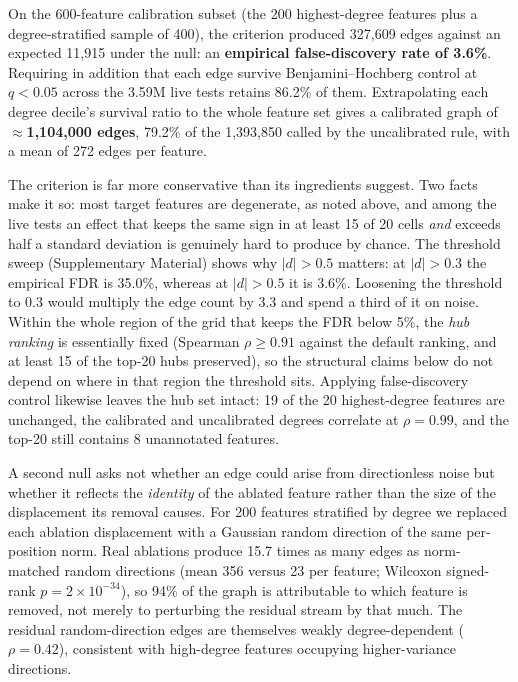 \documentclass[11pt,onecolumn]{article}
\begin{document}
On the 600-feature calibration subset (the 200 highest-degree features plus a degree-stratified sample of 400), the criterion produced 327{,}609 edges against an expected 11{,}915 under the null: an \textbf{empirical false-discovery rate of 3.6\%}. Requiring in addition that each edge survive Benjamini--Hochberg control at $q<0.05$ across the 3.59M live tests retains 86.2\% of them. Extrapolating each degree decile's survival ratio to the whole feature set gives a calibrated graph of \textbf{$\approx$1{,}104{,}000 edges}, 79.2\% of the 1{,}393{,}850 called by the uncalibrated rule, with a mean of 272 edges per feature.

The criterion is far more conservative than its ingredients suggest. Two facts make it so: most target features are degenerate, as noted above, and among the live tests an effect that keeps the same sign in at least 15 of 20 cells \emph{and} exceeds half a standard deviation is genuinely hard to produce by chance. The threshold sweep (Supplementary Material) shows why $|d|>0.5$ matters: at $|d|>0.3$ the empirical FDR is 35.0\%, whereas at $|d|>0.5$ it is 3.6\%. Loosening the threshold to $0.3$ would multiply the edge count by 3.3 and spend a third of it on noise. Within the whole region of the grid that keeps the FDR below 5\%, the \emph{hub ranking} is essentially fixed (Spearman $\rho\geq0.91$ against the default ranking, and at least 15 of the top-20 hubs preserved), so the structural claims below do not depend on where in that region the threshold sits. Applying false-discovery control likewise leaves the hub set intact: 19 of the 20 highest-degree features are unchanged, the calibrated and uncalibrated degrees correlate at $\rho=0.99$, and the top-20 still contains 8 unannotated features.

A second null asks not whether an edge could arise from directionless noise but whether it reflects the \emph{identity} of the ablated feature rather than the size of the displacement its removal causes. For 200 features stratified by degree we replaced each ablation displacement with a Gaussian random direction of the same per-position norm. Real ablations produce 15.7 times as many edges as norm-matched random directions (mean 356 versus 23 per feature; Wilcoxon signed-rank $p=2\times10^{-34}$), so 94\% of the graph is attributable to which feature is removed, not merely to perturbing the residual stream by that much. The residual random-direction edges are themselves weakly degree-dependent ($\rho=0.42$), consistent with high-degree features occupying higher-variance directions.
\end{document}
